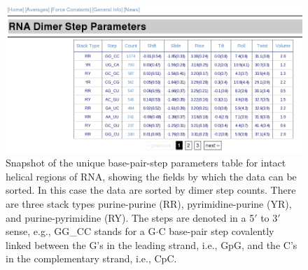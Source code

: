 \begin{figure}[htbp]
\centering
\includegraphics[angle=0, scale=0.44]{Chapter4/average.png}
\caption{Snapshot of  the unique  base-pair-step parameters  table for
intact helical  regions of RNA, showing  the fields by  which the data
can  be  sorted. In  this  case  the data  are  sorted  by dimer  step
counts.   There   are    three   stack   types   purine-purine   (RR),
pyrimidine-purine  (YR),  and purine-pyrimidine  (RY).  The steps  are
denoted in a  5$'$ to 3$'$ sense, e.g., GG\_CC  stands for a G$\cdot$C
base-pair  step  covalently linked  between  the  G's  in the  leading
strand,  i.e., GpG,  and the  C's in  the complementary  strand, i.e.,
CpC.}
\label{fig:average}
\end{figure}  

